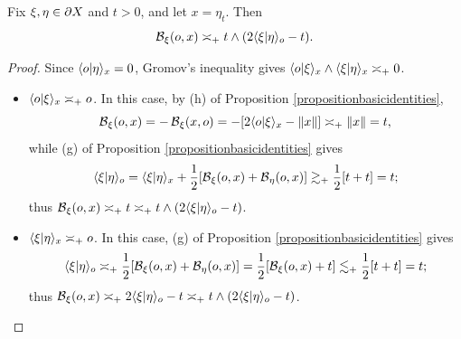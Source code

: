 \begin{lemma}
\label{lemmabetatinterpretation}
Fix $\xi,\eta\in \partial X$ and $t > 0$, and let $x = \eta_t$. Then
\begin{equation}
\label{betatinterpretation}
\operatorname{\mathcal B}_\xi(o,x) \asymp_+ t \wedge (2\langle\xi|\eta\rangle_o - t).
\end{equation}
\end{lemma}
\begin{proof}
Since $\langle o|\eta\rangle_x = 0$, Gromov's inequality gives $\langle o|\xi\rangle_x \wedge \langle \xi|\eta\rangle_x \asymp_+ 0$.

\begin{itemize}
\item[Case 1:] $\langle o|\xi\rangle_x \asymp_+ o$. In this case, by (h) of Proposition \ref{propositionbasicidentities},
\[
\operatorname{\mathcal B}_\xi(o,x) = - \operatorname{\mathcal B}_\xi(x,o) = -[2\langle o|\xi\rangle_x - \|x\|] \asymp_+ \|x\| = t,
\]
while (g) of Proposition \ref{propositionbasicidentities} gives
\[
\langle \xi|\eta\rangle_o = \langle \xi|\eta\rangle_x + \frac12[\operatorname{\mathcal B}_\xi(o,x) + \operatorname{\mathcal B}_\eta(o,x)] \gtrsim_+ \frac12[t + t] = t;
\]
thus $\operatorname{\mathcal B}_\xi(o,x) \asymp_+ t \asymp_+ t\wedge(2\langle \xi|\eta\rangle_o - t)$.
\item[Case 2:] $\langle \xi|\eta\rangle_x \asymp_+ o$. In this case, (g) of Proposition \ref{propositionbasicidentities} gives
\[
\langle \xi|\eta\rangle_o \asymp_+ \frac12[\operatorname{\mathcal B}_\xi(o,x) + \operatorname{\mathcal B}_\eta(o,x)] = \frac12[\operatorname{\mathcal B}_\xi(o,x) + t] \lesssim_+ \frac12[t + t] = t;
\]
thus $\operatorname{\mathcal B}_\xi(o,x) \asymp_+ 2\langle \xi|\eta\rangle_o - t \asymp_+ t\wedge(2\langle \xi|\eta\rangle_o - t)$.
\end{itemize}
\end{proof}

